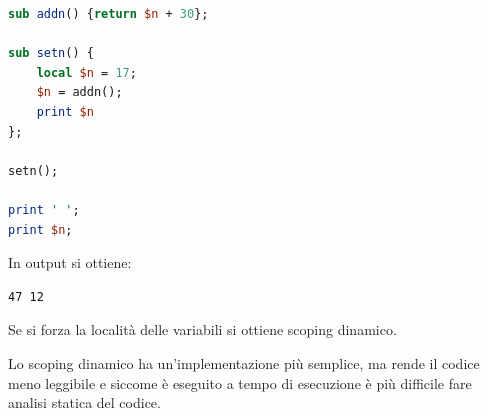 \documentclass[a4paper]{article}
\begin{document}
\begin{Example}{}{}
\begin{enumerate}
\begin{itemize}
\begin{lstlisting}[language=Perl]
sub addn() {return $n + 30};

sub setn() {
    local $n = 17;
    $n = addn();
    print $n
};

setn();

print ' ';
print $n;
\end{lstlisting}
    In output si ottiene:
\begin{lstlisting}
47 12
\end{lstlisting}
          Se si forza la località delle variabili si ottiene scoping dinamico.
      \end{itemize}
  \end{enumerate}
\end{Example}

\vspace{1em}
\noindent
Lo scoping dinamico ha un'implementazione più semplice, ma rende il codice
meno leggibile e siccome è eseguito a tempo di esecuzione è più difficile 
fare analisi statica del codice.
\end{document}

